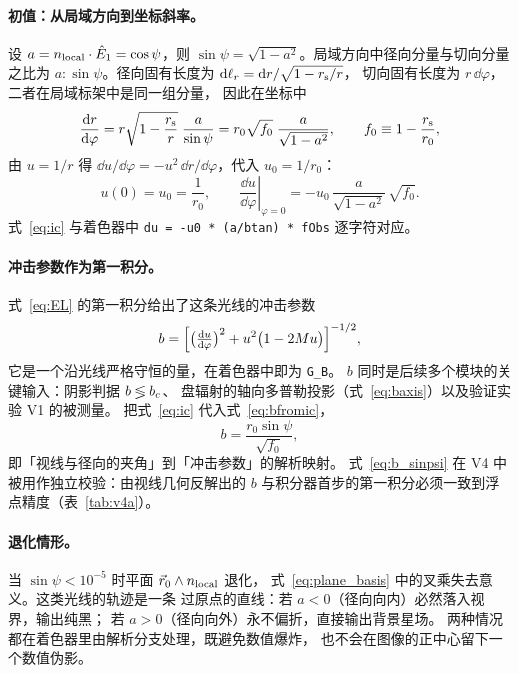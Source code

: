 \paragraph{初值：从局域方向到坐标斜率。}
设 $a=n_{\rm local}\cdot\hat E_1=\cos\psi$，则
$\sin\psi=\sqrt{1-a^2}$。局域方向中径向分量与切向分量之比为
$a:\sin\psi$。径向固有长度为 $\mathrm{d} \ell_r=\mathrm{d} r/\sqrt{1-r_{\mathrm s}/r}$，
切向固有长度为 $r\,\dd\varphi$，二者在局域标架中是同一组分量，
因此在坐标中
\begin{equation}
\frac{\mathrm{d} r}{\mathrm{d}\varphi}
=r\sqrt{1-\frac{r_{\mathrm s}}{r}}\;\frac{a}{\sin\psi}
=r_0\sqrt{f_0}\;\frac{a}{\sqrt{1-a^2}},
\qquad f_0\equiv 1-\frac{r_{\mathrm s}}{r_0},
\label{eq:drdphi}
\end{equation}
由 $u=1/r$ 得 $\dd u/\dd\varphi=-u^2\,\dd r/\dd\varphi$，代入 $u_0=1/r_0$：
\begin{equation}
u(0)=u_0=\frac{1}{r_0},\qquad
\left.\frac{\dd u}{\dd\varphi}\right|_{\varphi=0}
=-u_0\,\frac{a}{\sqrt{1-a^2}}\,\sqrt{f_0}.
\label{eq:ic}
\end{equation}
式~\eqref{eq:ic} 与着色器中
\texttt{du = -u0 * (a/btan) * fObs} 逐字符对应。

\paragraph{冲击参数作为第一积分。}
式~\eqref{eq:EL} 的第一积分给出了这条光线的冲击参数
\begin{equation}
b=\Bigl[\bigl(\tfrac{\mathrm{d} u}{\mathrm{d}\varphi}\bigr)^{2}
+u^{2}\bigl(1-2M u\bigr)\Bigr]^{-1/2},
\label{eq:bfromic}
\end{equation}
它是一个沿光线严格守恒的量，在着色器中即为 \texttt{G\_B}。
$b$ 同时是后续多个模块的关键输入：阴影判据 $b\lessgtr b_{c}$、
盘辐射的轴向多普勒投影（式~\eqref{eq:baxis}）以及验证实验 V1 的被测量。
把式~\eqref{eq:ic} 代入式~\eqref{eq:bfromic}，
\begin{equation}
b=\frac{r_0\sin\psi}{\sqrt{f_0}},
\label{eq:b_sinpsi}
\end{equation}
即「视线与径向的夹角」到「冲击参数」的解析映射。
式~\eqref{eq:b_sinpsi} 在 V4 中被用作独立校验：由视线几何反解出的 $b$
与积分器首步的第一积分必须一致到浮点精度（表~\ref{tab:v4a}）。

\paragraph{退化情形。}
当 $\sin\psi<10^{-5}$ 时平面 $\vec r_0\wedge n_{\rm local}$ 退化，
式~\eqref{eq:plane_basis} 中的叉乘失去意义。这类光线的轨迹是一条
过原点的直线：若 $a<0$（径向向内）必然落入视界，输出纯黑；
若 $a>0$（径向向外）永不偏折，直接输出背景星场。
两种情况都在着色器里由解析分支处理，既避免数值爆炸，
也不会在图像的正中心留下一个数值伪影。

